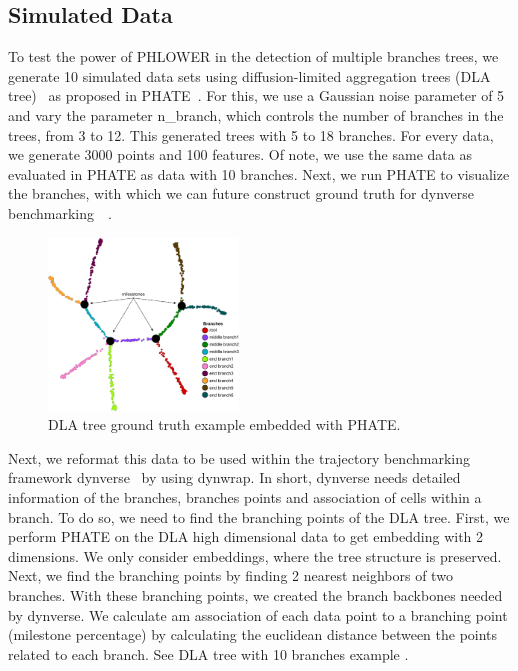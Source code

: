 \subsection{Simulated Data}
\label{PHLOWER_bench:sim}
To test the power of PHLOWER in the detection of multiple branches trees, we generate 10 simulated data sets using diffusion-limited aggregation trees (DLA tree)~\citep{witten1981diffusion} as proposed in PHATE~\citep{moon2017phate}. For this, we use a Gaussian noise parameter of 5 and vary the parameter n\_branch, which controls the number of branches in the trees, from 3 to 12. This generated trees with 5 to 18 branches.  For every data, we generate \num{3000} points and \num{100} features. Of note, we use the same data as evaluated in PHATE as data with 10 branches. Next, we run PHATE to visualize the branches, with which we can future construct ground truth for dynverse benchmarking~~.

\begin{figure}[!h]
	\centering
	\includegraphics[width=0.45\textwidth]{DLA_example/fig}
	\vspace{0.1cm}
	\caption[DLA tree ground truth example]{DLA tree ground truth example embedded with PHATE.}
	\label{fig:DLA_example}
\end{figure}


Next, we reformat this data to be used within the trajectory benchmarking framework dynverse~\citep{saelens2019comparison} by using dynwrap. In short, dynverse needs detailed information of the branches, branches points and association of cells within a branch.  To do so, we need to find the branching points of the DLA tree. First, we perform PHATE on the DLA high dimensional data to get embedding with 2 dimensions. We only consider embeddings, where the tree structure is preserved. Next, we find the branching points by finding 2 nearest neighbors of two branches. With these branching points, we created the branch backbones needed by dynverse. We calculate am association of each data point to a branching point (milestone percentage) by calculating the euclidean distance between the points related to each branch. See DLA tree with 10 branches example .

